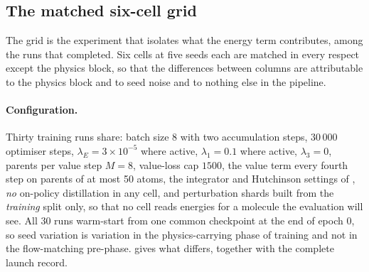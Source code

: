 \subsection{The matched six-cell grid}
\label{app:p0cells}

The grid is the experiment that isolates what the energy term contributes, among the runs
that completed. Six cells at five seeds each
are matched in every respect except the physics block, so that the differences between
columns are attributable to the physics block and to seed noise and to nothing else in
the pipeline.

\paragraph{Configuration.} Thirty training runs share: batch size 8 with two
accumulation steps, $30\,000$ optimiser steps, $\lambda_E = 3\times10^{-5}$ where
active, $\lambda_1 = 0.1$ where active, $\lambda_3 = 0$, parents per value step
$M = 8$, value-loss cap $1500$, the value term every fourth step on parents of at most
50 atoms, the integrator and Hutchinson settings of , \emph{no} on-policy
distillation in any cell, and perturbation shards built from the \emph{training} split
only, so that no cell reads energies for a molecule the evaluation will see. All 30
runs warm-start from one common checkpoint at the end of epoch 0, so seed variation is
variation in the physics-carrying phase of training and not in the flow-matching
pre-phase.  gives what differs, together with the complete launch
record.

